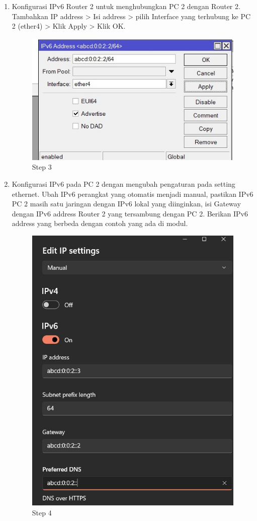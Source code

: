 \begin{enumerate}
	\item Konfigurasi IPv6 Router 2 untuk menghubungkan PC 2 dengan Router 2. Tambahkan IP address
	> Isi address > pilih Interface yang terhubung ke PC 2 (ether4) > Klik Apply > Klik OK.
	
	\begin{figure}[H]
		\centering
		\includegraphics[width=0.7\linewidth]{P5/img/2step3.jpg}
		\caption{Step 3}
		\label{fig:gambar1}
	\end{figure}

	\item Konfigurasi IPv6 pada PC 2 dengan mengubah pengaturan pada setting ethernet. Ubah IPv6
	perangkat yang otomatis menjadi manual, pastikan IPv6 PC 2 masih satu jaringan dengan IPv6
	lokal yang diinginkan, isi Gateway dengan IPv6 address Router 2 yang tersambung dengan PC
	2. Berikan IPv6 address yang berbeda dengan contoh yang ada di modul.
	
	\begin{figure}[H]
		\centering
		\includegraphics[width=0.7\linewidth]{P5/img/2step4.jpg}
		\caption{Step 4}
		\label{fig:gambar1}
	\end{figure}


\end{enumerate}
